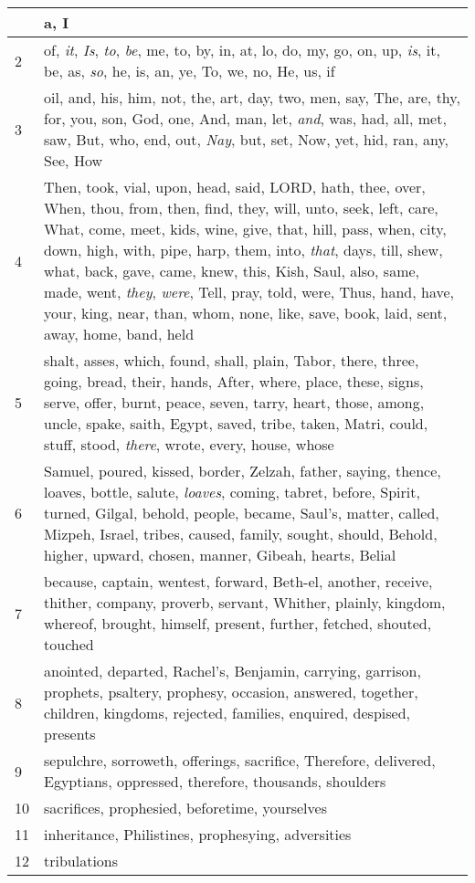 \begin{longtable}{l|p{3.75in}}
\hline \hline
\endlastfoot
1 & a, I \\ \hline
2 & of, \emph{it}, \emph{Is}, \emph{to}, \emph{be}, me, to, by, in, at, lo, do, my, go, on, up, \emph{is}, it, be, as, \emph{so}, he, is, an, ye, To, we, no, He, us, if \\ \hline
3 & oil, and, his, him, not, the, art, day, two, men, say, The, are, thy, for, you, son, God, one, And, man, let, \emph{and}, was, had, all, met, saw, But, who, end, out, \emph{Nay}, but, set, Now, yet, hid, ran, any, See, How \\ \hline
4 & Then, took, vial, upon, head, said, LORD, hath, thee, over, When, thou, from, then, find, they, will, unto, seek, left, care, What, come, meet, kids, wine, give, that, hill, pass, when, city, down, high, with, pipe, harp, them, into, \emph{that}, days, till, shew, what, back, gave, came, knew, this, Kish, Saul, also, same, made, went, \emph{they}, \emph{were}, Tell, pray, told, were, Thus, hand, have, your, king, near, than, whom, none, like, save, book, laid, sent, away, home, band, held \\ \hline
5 & shalt, asses, which, found, shall, plain, Tabor, there, three, going, bread, their, hands, After, where, place, these, signs, serve, offer, burnt, peace, seven, tarry, heart, those, among, uncle, spake, saith, Egypt, saved, tribe, taken, Matri, could, stuff, stood, \emph{there}, wrote, every, house, whose \\ \hline
6 & Samuel, poured, kissed, border, Zelzah, father, saying, thence, loaves, bottle, salute, \emph{loaves}, coming, tabret, before, Spirit, turned, Gilgal, behold, people, became, Saul's, matter, called, Mizpeh, Israel, tribes, caused, family, sought, should, Behold, higher, upward, chosen, manner, Gibeah, hearts, Belial \\ \hline
7 & because, captain, wentest, forward, Beth-el, another, receive, thither, company, proverb, servant, Whither, plainly, kingdom, whereof, brought, himself, present, further, fetched, shouted, touched \\ \hline
8 & anointed, departed, Rachel's, Benjamin, carrying, garrison, prophets, psaltery, prophesy, occasion, answered, together, children, kingdoms, rejected, families, enquired, despised, presents \\ \hline
9 & sepulchre, sorroweth, offerings, sacrifice, Therefore, delivered, Egyptians, oppressed, therefore, thousands, shoulders \\ \hline
10 & sacrifices, prophesied, beforetime, yourselves \\ \hline
11 & inheritance, Philistines, prophesying, adversities \\ \hline
12 & tribulations \\ \hline
\end{longtable}






